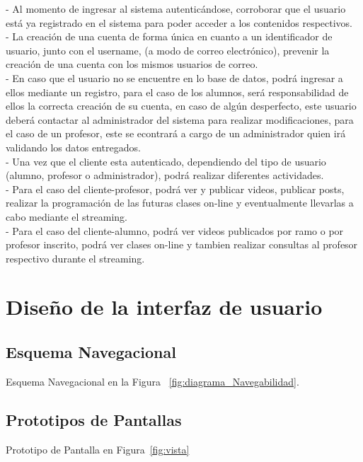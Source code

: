 \documentclass[12pt]{article}
\begin{document}
-	Al momento de ingresar al sistema autenticándose, corroborar que el usuario está ya registrado en
el sistema para poder acceder a los contenidos respectivos.\\

- 	La creación de una cuenta de forma única en cuanto a un identificador de usuario, junto con el username,
	(a modo de correo electrónico), prevenir la creación de una cuenta con los mismos usuarios de correo.\\

-	En caso que el usuario no se encuentre en lo base de datos, podrá ingresar a ellos mediante un 
registro, para el caso de los alumnos, será responsabilidad de ellos la correcta creación de su cuenta,
en caso de algún desperfecto, este usuario deberá contactar al administrador del sistema para realizar 
modificaciones, para el caso de un profesor, este se econtrará a cargo de un administrador quien irá validando 
los datos entregados.\\

-	Una vez que el cliente esta autenticado, dependiendo del tipo de usuario (alumno, profesor o 
administrador), podrá realizar diferentes actividades.\\

-	Para el caso del cliente-profesor, podrá ver y publicar videos, publicar posts, realizar la programación 
de las futuras clases on-line y eventualmente llevarlas a cabo mediante el streaming.\\

-	Para el caso del cliente-alumno, podrá ver videos publicados por ramo o por profesor
inscrito, podrá ver clases on-line y tambien realizar consultas al profesor respectivo durante el 
streaming.

\newpage
\section{Dise\~no de la interfaz de usuario}
\subsection{Esquema Navegacional}
Esquema Navegacional en la Figura ~\ref{fig:diagrama_Navegabilidad}.

\subsection{Prototipos de Pantallas}
Prototipo de Pantalla en Figura~\ref{fig:vista}
\end{document}
